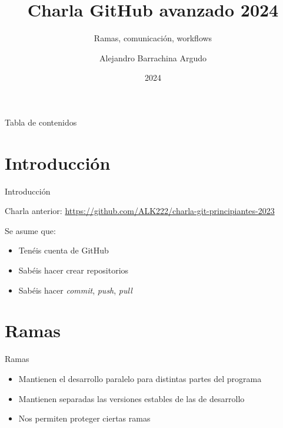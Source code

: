 \documentclass{beamer}
\title{Charla GitHub avanzado 2024}
\subtitle{Ramas, comunicación, workflows}
\date{2024}
\author{Alejandro Barrachina Argudo}
\institute{Universidad Complutense de Madrid}
\begin{document}
\maketitle

\begin{frame}{Tabla de contenidos}
    \tableofcontents
\end{frame}

\section{Introducción}
\begin{frame}{Introducción}

    Charla anterior: \url{https://github.com/ALK222/charla-git-principiantes-2023}

    Se asume que:
    \begin{itemize}
        \item Tenéis cuenta de GitHub
        \item Sabéis hacer crear repositorios
        \item Sabéis hacer \textit{commit}, \textit{push}, \textit{pull}
    \end{itemize}
\end{frame}

\section{Ramas}
\begin{frame}{Ramas}
    \begin{itemize}
        \item Mantienen el desarrollo paralelo para distintas partes del programa

        \item Mantienen separadas las versiones estables de las de desarrollo

        \item Nos permiten proteger ciertas ramas
    \end{itemize}

\end{frame}
\end{document}
